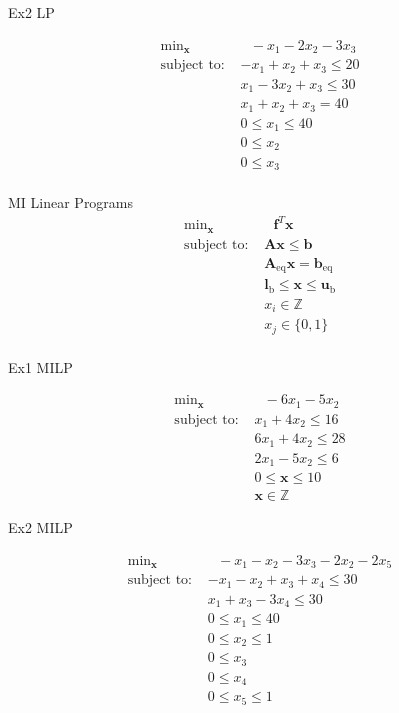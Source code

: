 \documentclass{article}
\begin{document}
Ex2 LP

\begin{align*}
    \text{min}_{\mathbf{x}}& \text{ } -x_1 - 2x_2 - 3x_3 \\
    \mbox{subject to: } & -x_1 + x_2 + x_3 \le 20\\
                        & x_1 - 3x_2 + x_3 \le 30\\
                        & x_1 + x_2 + x_3 = 40\\
                       & 0 \le x_1 \le 40\\
                       & 0 \le x_2 \\
                       & 0 \le x_3 \\
\end{align*}


MI Linear Programs
\begin{align*}
    \text{min}_{\mathbf{x}}& \text{ } \mathbf{f}^T \mathbf{x} \\
    \mbox{subject to: }& \mathbf{A}\mathbf{x} \le \mathbf{b}\\
                       & \mathbf{A}_{\text{eq}}\mathbf{x} =  \mathbf{b}_{\text{eq}}\\
                       & \mathbf{l}_{\text{b}} \le \mathbf{x} \le \mathbf{u}_{\text{b}}\\
                       & x_i \in \mathbb{Z}\\
                       & x_j \in \{0,1\}\\
\end{align*}

Ex1 MILP

\begin{align*}
    \text{min}_{\mathbf{x}}& \text{ } -6x_1 - 5x_2 \\
    \mbox{subject to: } & x_1 + 4x_2 \le 16\\
                        & 6x_1 + 4x_2 \le 28\\
                        & 2x_1 - 5x_2 \le 6\\
                        & 0 \le \mathbf{x} \le 10\\
                        & \mathbf{x} \in \mathbb{Z}
\end{align*}

Ex2 MILP

\begin{align*}
    \text{min}_{\mathbf{x}}& \text{ } -x_1 - x_2 - 3x_3 - 2x_2 - 2x_5 \\
    \mbox{subject to: } & -x_1 - x_2 + x_3 + x_4 \le 30\\
                        & x_1 + x_3 - 3x_4 \le 30\\
                        & 0 \le x_1 \le 40\\
                        & 0 \le x_2 \le 1\\
                        & 0 \le x_3\\
                        & 0 \le x_4\\
                        & 0 \le x_5 \le 1
\end{align*}
\end{document}
